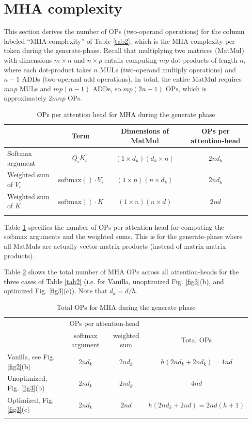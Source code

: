 \documentclass{article}
\newcommand{\mc}[2]{\multicolumn{#1}{c}{#2}}       %
\def\fline{\Xhline{2\arrayrulewidth}}              %
\begin{document}
\section{MHA complexity}
This section derives the number of OPs (two-operand operations) for the column labeled ``MHA complexity'' of Table \ref{tab2}, which is the MHA-complexity per token during the generate-phase. Recall that multiplying two matrices (MatMul) with dimensions $m \times n$ and $n \times p$ entails computing $m p$ dot-products of length $n$, where each dot-product takes $n$ MULs (two-operand multiply operations) and $n-1$ ADDs (two-operand add operations). In total, the entire MatMul requires $mnp$ MULs and $mp(n-1)$ ADDs, so $mp(2n-1)$ OPs, which is approximately $2mnp$ OPs.
\begin{table}[h!] \centering
  \caption{OPs per attention head for MHA during the generate phase}
  \begin{tabular}{lccc} \fline
                         & Term & Dimensions of MatMul   & OPs per attention-head                    \\ \hline
  Softmax argument       & $Q_i K_i^\top$                & $(1 \times d_k)(d_k \times n)$   & $2nd_k$ \\
  Weighted sum of $V_i$  & $\text{softmax}() \cdot V_i$  & $(1 \times n)(n \times d_k)$    & $2nd_k$ \\
  Weighted sum of $K$    & $\text{softmax}() \cdot K$    & $(1 \times n)(n \times d)$      & $2nd$   \\ \fline
\end{tabular} \label{tab8} \end{table}

Table \ref{tab8} specifies the number of OPs per attention-head for computing the softmax arguments and the weighted sums. This is for the generate-phase where all MatMuls are actually vector-matrix products (instead of matrix-matrix products).

Table \ref{tab9} shows the total number of MHA OPs across all attention-heads for the three cases of Table \ref{tab2} (i.e. for Vanilla, unoptimized Fig. \ref{fig3}(b), and optimized Fig. \ref{fig3}(c)). Note that $d_k = d / h$.
\begin{table}[h!] \centering
  \caption{Total OPs for MHA during the generate phase}
  \begin{tabular}{lccc} \fline
                                  & \mc{2}{OPs per attention-head}   &                            \\
                                  & softmax argument & weighted sum  & Total OPs                  \\ \hline
  Vanilla, see Fig. \ref{fig2}(b) & $2nd_k$          & $2nd_k$       & $h(2nd_k + 2nd_k) = 4nd$    \\
  Unoptimized, Fig. \ref{fig3}(b) & $2nd_k$          & $2nd_k$       & $4nd$                       \\
  Optimized, Fig. \ref{fig3}(c)   & $2nd_k$          & $2nd$         & $h(2nd_k + 2nd) = 2nd(h+1)$ \\ \fline
\end{tabular} \label{tab9} \end{table}
\end{document}
